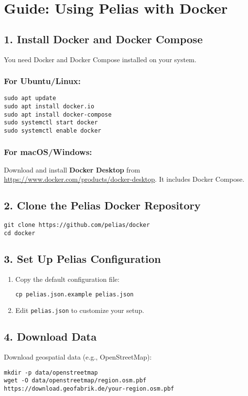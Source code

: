 \documentclass{article}
\begin{document}
\section*{Guide: Using Pelias with Docker}

\subsection*{1. Install Docker and Docker Compose}
You need Docker and Docker Compose installed on your system.

\subsubsection*{For Ubuntu/Linux:}
\begin{lstlisting}
sudo apt update
sudo apt install docker.io
sudo apt install docker-compose
sudo systemctl start docker
sudo systemctl enable docker
\end{lstlisting}

\subsubsection*{For macOS/Windows:}
Download and install \textbf{Docker Desktop} from \url{https://www.docker.com/products/docker-desktop}. It includes Docker Compose.

\subsection*{2. Clone the Pelias Docker Repository}
\begin{lstlisting}
git clone https://github.com/pelias/docker
cd docker
\end{lstlisting}

\subsection*{3. Set Up Pelias Configuration}
\begin{enumerate}
    \item Copy the default configuration file:
    \begin{lstlisting}
cp pelias.json.example pelias.json
    \end{lstlisting}
    \item Edit \texttt{pelias.json} to customize your setup.
\end{enumerate}

\subsection*{4. Download Data}
Download geospatial data (e.g., OpenStreetMap):
\begin{lstlisting}
mkdir -p data/openstreetmap
wget -O data/openstreetmap/region.osm.pbf https://download.geofabrik.de/your-region.osm.pbf
\end{lstlisting}
\end{document}
